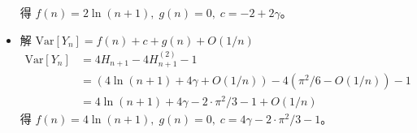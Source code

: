 \documentclass[11pt,fleqn]{article}
\begin{document}
\begin{description}
\begin{itemize}
			得 $f(n) = 2\ln (n+1), \; g(n) = 0, \; c = -2 + 2 \gamma$。
			\item 解 $\text{Var}[Y_n] = f(n) + c + g(n) + O(1/n)$
			\begin{align*}
				\text{Var}[Y_n] 
					&= 4 H_{n+1} - 4 H^{(2)}_{n+1} - 1 \\
					&= \left(4 \ln (n+1) + 4 \gamma + O(1/n)\right)
						- 4 \left( \pi^2 / 6 - O(1/n)\right) - 1 \\
					&= 4 \ln (n+1) + 4 \gamma - 2 \cdot \pi^2 / 3 - 1 + O(1/n)
			\end{align*}
			得 $f(n) = 4\ln (n+1), \; g(n) = 0, \; c = 4 \gamma - 2 \cdot \pi^2 / 3 - 1$。
		\end{itemize}
\end{description}
\end{document}
